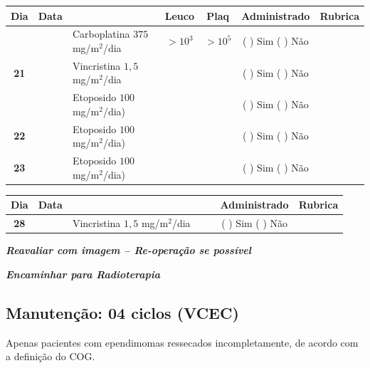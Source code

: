 \documentclass[11pt,a4paper,oldfontcommands]{memoir}
\begin{document}
\begin{center}
\begin{longtable}{p{1cm}c|p{5cm}|p{1.5cm}p{1.5cm}|c|c}
	\hline
	\multicolumn{1}{c|}{\multirow{1}{*}{\textbf{Dia}}}&{Data}&{}&\multicolumn{1}{c|}{Leuco}&\multicolumn{1}{c|}{Plaq}&{Administrado}&{Rubrica} \\
    \hline
    \multicolumn{1}{c|}{\multirow{3}{*}{\textbf{21}}}&\multirow{2}{*}{}&{Carboplatina 3\(75\) mg/m\(^2\)/dia}&\multicolumn{1}{c|}{\(>10^3\)}&\multicolumn{1}{c|}{\(>10^5\)}&{(  ) Sim (  ) Não}&\\
    \cline{4-5}
    \multicolumn{1}{c|}{}&&{Vincristina \(1,5\) mg/m\(^2\)/dia}&\multicolumn{1}{c|}{}&&{(  ) Sim (  ) Não}&\\
    \cline{4-5}
    \multicolumn{1}{c|}{}&{}&{Etoposido \(100\) mg/m\(^2\)/dia)}&{}&&{(  ) Sim (  ) Não}&\\
    \cline{2-3}\cline{6-6}
    \multicolumn{1}{c|}{\textbf{22}}&&{Etoposido \(100\) mg/m\(^2\)/dia)}&&&{(  ) Sim (  ) Não}&\\
    \cline{2-3}\cline{6-6}
    \multicolumn{1}{c|}{\multirow{1}{*}{\textbf{23}}}&&{Etoposido \(100\) mg/m\(^2\)/dia)}&{}&&{(  ) Sim (  ) Não}&\\
    \hline
\end{longtable}
\begin{longtable}{p{1cm}c|p{4cm}|p{2cm}p{2cm}|c|c}
	\hline
	\multicolumn{1}{c|}{\multirow{1}{*}{\textbf{Dia}}}&{Data}&{}&{}&&{Administrado}&{Rubrica} \\
    \hline
    \multicolumn{1}{c|}{\textbf{28}}&&{Vincristina \(1,5\) mg/m\(^2\)/dia}&\multicolumn{1}{c}{}&&{(  ) Sim (  ) Não}&\\
    \hline
\end{longtable}
\textit{\textbf{Reavaliar com imagem – Re-operação se possível}}

\textit{\textbf{Encaminhar para Radioterapia}}

\end{center}

\subsection{Manutenção: 04 ciclos (VCEC)}
Apenas pacientes com ependimomas ressecados incompletamente, de acordo com a definição do COG.
\end{document}
